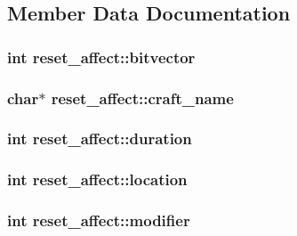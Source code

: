 \subsection{Member Data Documentation}
\hypertarget{structreset__affect_a23b9ab03dfb7baa3268278061635e3a4}{
\subsubsection[{bitvector}]{\setlength{\rightskip}{0pt plus 5cm}int reset\-\_\-affect\-::bitvector}}\label{structreset__affect_a23b9ab03dfb7baa3268278061635e3a4}
\hypertarget{structreset__affect_a61c538541fb1ef9ffacfd7731ae08ee7}{
\subsubsection[{craft\-\_\-name}]{\setlength{\rightskip}{0pt plus 5cm}char$\ast$ reset\-\_\-affect\-::craft\-\_\-name}}\label{structreset__affect_a61c538541fb1ef9ffacfd7731ae08ee7}
\hypertarget{structreset__affect_a01a8e81b7880c8db9328cc462b7d8029}{
\subsubsection[{duration}]{\setlength{\rightskip}{0pt plus 5cm}int reset\-\_\-affect\-::duration}}\label{structreset__affect_a01a8e81b7880c8db9328cc462b7d8029}
\hypertarget{structreset__affect_abfd511fc5622a26993ef720fbef8f271}{
\subsubsection[{location}]{\setlength{\rightskip}{0pt plus 5cm}int reset\-\_\-affect\-::location}}\label{structreset__affect_abfd511fc5622a26993ef720fbef8f271}
\hypertarget{structreset__affect_adb8f987e55f7bd4a19a663c6effe7225}{
\subsubsection[{modifier}]{\setlength{\rightskip}{0pt plus 5cm}int reset\-\_\-affect\-::modifier}}\label{structreset__affect_adb8f987e55f7bd4a19a663c6effe7225}
